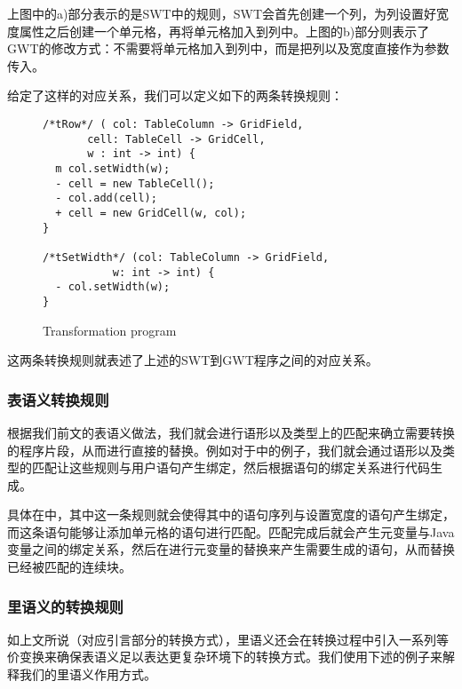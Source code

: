 上图中的a)部分表示的是SWT中的规则，SWT会首先创建一个列，为列设置好宽度属性之后创建一个单元格，再将单元格加入到列中。上图的b)部分则表示了GWT的修改方式：不需要将单元格加入到列中，而是把列以及宽度直接作为参数传入。

给定了这样的对应关系，我们可以定义如下的两条转换规则：

\begin{figure}[ht]
\begin{center}
\begin{smpage}{0.5\columnwidth}
\begin{lstlisting}[style=patl]
/*tRow*/ ( col: TableColumn -> GridField,
       cell: TableCell -> GridCell,
       w : int -> int) {
  m col.setWidth(w);
  - cell = new TableCell();
  - col.add(cell);
  + cell = new GridCell(w, col);
}

/*tSetWidth*/ (col: TableColumn -> GridField,
           w: int -> int) {
  - col.setWidth(w);
}
\end{lstlisting}
\end{smpage}
\end{center}
\caption{Transformation program}
\label{fig:transform}
\end{figure}

这两条转换规则就表述了上述的SWT到GWT程序之间的对应关系。

\subsubsection{表语义转换规则}

根据我们前文的表语义做法，我们就会进行语形以及类型上的匹配来确立需要转换的程序片段，从而进行直接的替换。例如对于中的例子，我们就会通过语形以及类型的匹配让这些规则与用户语句产生绑定，然后根据语句的绑定关系进行代码生成。

具体在中，其中这一条规则就会使得其中的语句序列与设置宽度的语句产生绑定，而这条语句能够让添加单元格的语句进行匹配。匹配完成后就会产生元变量与Java变量之间的绑定关系，然后在进行元变量的替换来产生需要生成的语句，从而替换已经被匹配的连续块。

\subsubsection{里语义的转换规则}
如上文所说（对应引言部分的转换方式），里语义还会在转换过程中引入一系列等价变换来确保表语义足以表达更复杂环境下的转换方式。我们使用下述的例子来解释我们的里语义作用方式。


